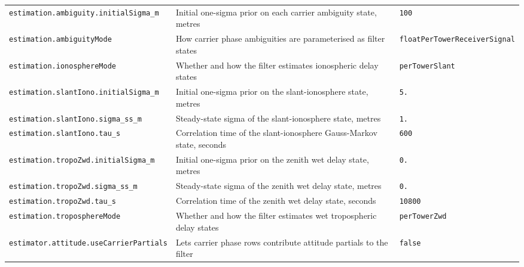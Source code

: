 \begin{center}
\begin{longtable}{>{\raggedright\arraybackslash\scriptsize\ttfamily}p{}|>{\raggedright\arraybackslash}p{}|>{\raggedright\arraybackslash\scriptsize\ttfamily}p{}}
\hline
\multicolumn{3}{l}{\textbf{Estimator configuration}} \\ \hline
\texttt{estimation.\allowbreak ambiguity.\allowbreak initial\allowbreak Sigma\_\allowbreak m} & Initial one-sigma prior on each carrier ambiguity state, metres & \texttt{100} \\
\texttt{estimation.\allowbreak ambiguity\allowbreak Mode} & How carrier phase ambiguities are parameterised as filter states & \texttt{float\allowbreak Per\allowbreak Tower\allowbreak Receiver\allowbreak Signal} \\
\texttt{estimation.\allowbreak ionosphere\allowbreak Mode} & Whether and how the filter estimates ionospheric delay states & \texttt{per\allowbreak Tower\allowbreak Slant} \\
\texttt{estimation.\allowbreak slant\allowbreak Iono.\allowbreak initial\allowbreak Sigma\_\allowbreak m} & Initial one-sigma prior on the slant-ionosphere state, metres & \texttt{5.\allowbreak 0} \\
\texttt{estimation.\allowbreak slant\allowbreak Iono.\allowbreak sigma\_\allowbreak ss\_\allowbreak m} & Steady-state sigma of the slant-ionosphere state, metres & \texttt{1.\allowbreak 0} \\
\texttt{estimation.\allowbreak slant\allowbreak Iono.\allowbreak tau\_\allowbreak s} & Correlation time of the slant-ionosphere Gauss-Markov state, seconds & \texttt{600} \\
\texttt{estimation.\allowbreak tropo\allowbreak Zwd.\allowbreak initial\allowbreak Sigma\_\allowbreak m} & Initial one-sigma prior on the zenith wet delay state, metres & \texttt{0.\allowbreak 1} \\
\texttt{estimation.\allowbreak tropo\allowbreak Zwd.\allowbreak sigma\_\allowbreak ss\_\allowbreak m} & Steady-state sigma of the zenith wet delay state, metres & \texttt{0.\allowbreak 04} \\
\texttt{estimation.\allowbreak tropo\allowbreak Zwd.\allowbreak tau\_\allowbreak s} & Correlation time of the zenith wet delay state, seconds & \texttt{10800} \\
\texttt{estimation.\allowbreak troposphere\allowbreak Mode} & Whether and how the filter estimates wet tropospheric delay states & \texttt{per\allowbreak Tower\allowbreak Zwd} \\
\texttt{estimator.\allowbreak attitude.\allowbreak use\allowbreak Carrier\allowbreak Partials} & Lets carrier phase rows contribute attitude partials to the filter & \texttt{false} \\

\end{longtable}
\end{center}
